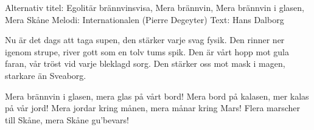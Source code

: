 \begin{song}

\begin{songmeta}
Alternativ titel: Egolitär brännvinsvisa, Mera brännvin,
Mera brännvin i glasen, Mera Skåne
Melodi: Internationalen (Pierre Degeyter)
Text: Hans Dalborg
\end{songmeta}

\begin{songtext}
Nu är det dags att taga supen,
den stärker varje svag fysik.
Den rinner ner igenom strupe,
river gott som en tolv tums spik.
Den är vårt hopp mot gula faran,
vår tröst vid varje bleklagd sorg.
Den stärker oss mot mask i magen,
starkare än Sveaborg.

Mera brännvin i glasen,
mera glas på vårt bord!
Mera bord på kalasen,
mer kalas på vår jord!
Mera jordar kring månen,
mera månar kring Mars!
Flera marscher till Skåne,
mera Skåne gu'bevars!
\end{songtext}

\end{song}
